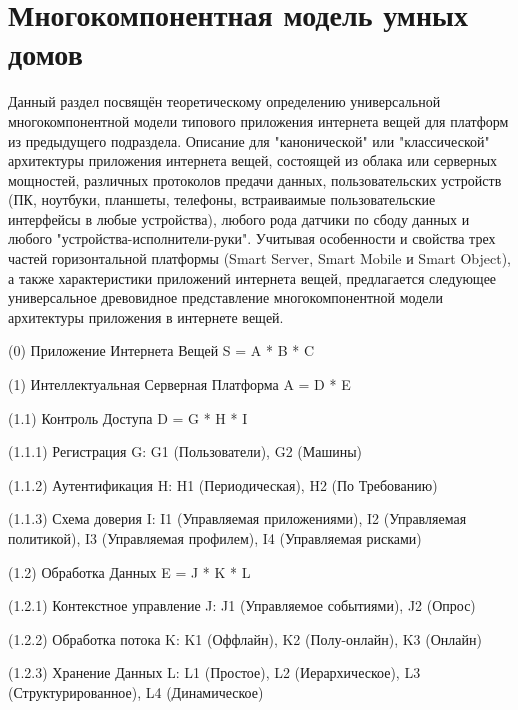 \begin{textitemize}
\end{textitemize}


\section{Многокомпонентная модель умных домов}
\label{sec_multicomponent_SH_model}

Данный раздел посвящён теоретическому определению универсальной многокомпонентной модели типового приложения интернета вещей для платформ из предыдущего подраздела. Описание для "канонической" или "классической" архитектуры приложения интернета вещей, состоящей из облака или серверных мощностей, различных протоколов предачи данных, пользовательских устройств (ПК, ноутбуки, планшеты, телефоны, встраиваимые пользовательские интерфейсы в любые устройства), любого рода датчики по сбоду данных и любого "устройства-исполнители-руки". Учитывая особенности и свойства трех частей горизонтальной платформы (Smart Server, Smart Mobile и Smart Object), а также характеристики приложений интернета вещей, предлагается следующее универсальное древовидное представление многокомпонентной модели архитектуры приложения в интернете вещей.

(0) Приложение Интернета Вещей S = A * B * C

(1) Интеллектуальная Серверная Платформа A = D * E

(1.1) Контроль Доступа D = G * H * I

(1.1.1) Регистрация G: G1 (Пользователи), G2 (Машины)

(1.1.2) Аутентификация H: H1 (Периодическая), H2 (По Требованию)

(1.1.3) Схема доверия I: I1 (Управляемая приложениями), I2 (Управляемая политикой), I3 (Управляемая профилем), I4 (Управляемая рисками)

(1.2) Обработка Данных E = J * K * L

(1.2.1) Контекстное управление J: J1 (Управляемое событиями), J2 (Опрос)

(1.2.2) Обработка потока K: K1 (Оффлайн), K2 (Полу-онлайн), K3 (Онлайн)

(1.2.3) Хранение Данных L: L1 (Простое), L2 (Иерархическое), L3 (Структурированное), L4 (Динамическое)

